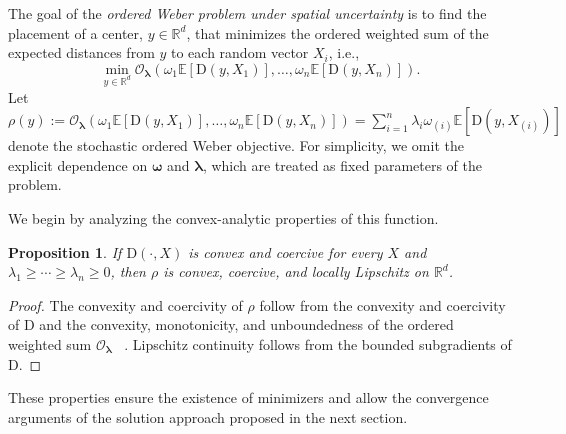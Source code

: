 \documentclass[letter,11pt, reqno]{amsart}
\newcommand{\R}{\mathbb{R}}
\newcommand{\E}{\mathbb{E}}
\newcommand{\D}{\mathrm{D}}
\renewcommand{\O}{\mathcal{O}}
\renewcommand{\;}{\quad}
\theoremstyle{thmstyleone}%
\newtheorem{proposition}[theorem]{Proposition}%
\theoremstyle{thmstyletwo}%
\theoremstyle{thmstylethree}%
\begin{document}
The goal of the \emph{ordered Weber problem under spatial uncertainty} is to find the placement of a center, $y \in \R^d$, that minimizes the ordered weighted sum of the expected distances from $y$ to each random vector $X_i$, i.e.,
\begin{equation}\label{eq:owp}\tag{\rm OWP-SU}
    \min_{y \in \R^d} \O_{\bm{\lambda}}\left(\omega_{1}\mathbb{E}\left[\D\left(y,X_{1}\right)\right],\ldots, \omega_{n}\mathbb{E}\left[\D\left(y,X_{n}\right)\right]\right).
\end{equation}
Let $\rho(y) := \O_{\bm{\lambda}}\left(\omega_{1}\mathbb{E}\left[\D\left(y,X_{1}\right)\right],\ldots, \omega_{n}\mathbb{E}\left[\D\left(y,X_{n}\right)\right]\right) = \sum_{i=1}^n \lambda_i \omega_{(i)} \E\left[\D(y,X_{(i)})\right]$  denote the stochastic ordered Weber objective. For simplicity, we omit the explicit dependence on ${\bm \omega}$ and ${\bm \lambda}$, which are treated as fixed parameters of the problem.

We begin by analyzing the convex-analytic properties of this function.
\begin{proposition}
If $\D(\cdot,X)$ is convex and coercive for every $X$ and  $\lambda_1 \geq \cdots \geq \lambda_n \ge 0$, then $\rho$ is convex, coercive, and locally Lipschitz on $\R^d$.
\end{proposition}
\begin{proof}
The convexity and coercivity of $\rho$ follow from the convexity and coercivity of $\D$ and the convexity, monotonicity, and unboundedness of the ordered weighted sum $\O_{\bm\lambda}$~ \cite[see][]{grzybowski2011ordered}. 
Lipschitz continuity follows from the bounded subgradients of $\D$.
\end{proof}
These properties ensure the existence of minimizers and allow the convergence arguments of the solution approach proposed in the next section.
\end{document}
